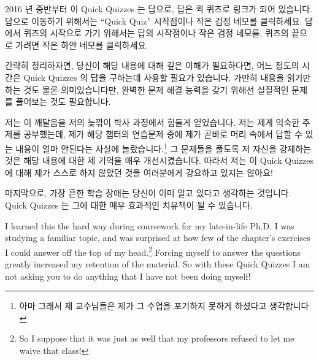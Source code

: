 {2016 년 중반부터 이 Quick Quizzes 는 답으로, 답은 퀵 퀴즈로 링크가 되어
있습니다.
답으로 이동하기 위해서는 ``Quick Quiz'' 시작점이나 작은 검정 네모를 클릭하세요.
답에서 퀴즈의 시작으로 가기 위해서는 답의 시작점이나 작은 검정 네모를, 퀴즈의
끝으로 가려면 작은 하얀 네모를 클릭하세요.
\iffalse

Note that as of mid-2016 the quick quizzes are hyperlinked
to the answers and vice versa.
Click either the ``Quick Quiz'' heading or the small black square
to move to the beginning of the answer.
From the answer, click on the heading or the small black square to
move to the beginning of the quiz, or, alternatively, click on the
small white square at the end of the answer to move to the end of the
corresponding quiz.
\fi
} \QuickQuizEnd

간략히 정리하자면, 당신이 해당 내용에 대해 깊은 이해가 필요하다면, 어느 정도의
시간은 Quick Quizzes 의 답을 구하는데 사용할 필요가 있습니다.
가만히 내용을 읽기만 하는 것도 물론 의미있습니다만, 완벽한 문제 해결 능력을
갖기 위해선 실질적인 문제를 풀어보는 것도 필요합니다.
\iffalse

In short, if you need a deep
understanding of the material, then you should invest some time
into answering the Quick Quizzes.
Don't get me wrong, passively reading the material can be quite
valuable, but gaining full problem-solving capability really
does require that you practice solving problems.
\fi

저는 이 깨달음을 저의 늦깎이 박사 과정에서 힘들게 얻었습니다.
저는 제게 익숙한 주제를 공부했는데, 제가 해당 챕터의 연습문제 중에 제가 곧바로
머리 속에서 답할 수 있는 내용이 얼마 안된다는 사실에 놀랐습니다.\footnote{
	아마 그래서 제 교수님들은 제가 그 수업을 포기하지 못하게 하셨다고
	생각합니다}
그 문제들을 풀도록 저 자신을 강제하는 것은 해당 내용에 대한 제 기억을 매우
개선시켰습니다.
따라서 저는 이 Quick Quizzes 에 대해 제가 스스로 하지 않았던 것을 여러분에게
강요하고 있지는 않아요!

마지막으로, 가장 흔한 학습 장애는 당신이 이미 알고 있다고 생각하는 것입니다.
Quick Quizzes 는 그에 대한 매우 효과적인 치유책이 될 수 있습니다.
\iffalse

I learned this the hard way during coursework for my late-in-life
Ph.D.
I was studying a familiar topic, and was surprised at how few of
the chapter's exercises I could answer off the top of my head.\footnote{
	So I suppose that it was just as well that my professors refused
	to let me waive that class!}
Forcing myself to answer the questions greatly increased my
retention of the material.
So with these Quick Quizzes I am not asking you to do anything
that I have not been doing myself!

